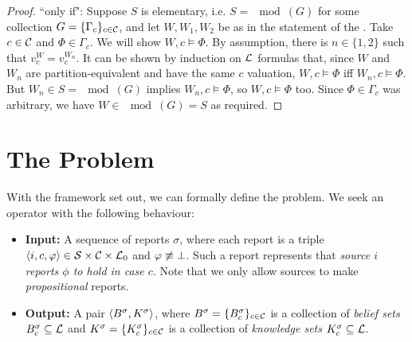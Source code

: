 \begin{proof}
    ``only if": Suppose $S$ is elementary, i.e. $S = \mod(G)$ for some
    collection $G = \{\Gamma_c\}_{c \in \mathcal{C}}$, and let $W, W_1, W_2$ be as in
    the statement of the . Take $c
    \in \mathcal{C}$ and $\Phi \in \Gamma_c$. We will show $W, c \models \Phi$. By assumption,
    there is $n \in \{1, 2\}$ such that $v^W_c = v^{W_n}_c$. It can be shown by
    induction on $\mathcal{L}{}$ formulas that, since $W$ and $W_n$ are
    partition-equivalent and have the same $c$ valuation, $W, c \models \Phi$ iff
    $W_n, c \models \Phi$. But $W_n \in S = \mod(G)$ implies $W_n, c \models
    \Phi$,
    so $W, c \models \Phi$ too.  Since $\Phi \in \Gamma_c$ was arbitrary, we have $W
    \in \mod(G) = S$ as required.

\end{proof}

\section{The Problem}
\label{kr_sec_the_problem}

With the framework set out, we can formally define the problem. We
seek an operator with the following behaviour:

\begin{itemize}

\item \textbf{Input:} A sequence of reports $\sigma$, where each report is a
      triple $\langle {i, c, \varphi} \rangle \in \mathcal{S} \times \mathcal{C} \times \mathcal{L}{}_0$ and $\varphi
      \not\equiv \bot$. Such a report represents that {\em source $i$
      reports $\phi$ to hold in case $c$}. Note that we only allow sources to
      make \emph{propositional} reports.

\item \textbf{Output:} A pair $\langle {B^\sigma, K^\sigma} \rangle$, where $B^\sigma =
      \{B^\sigma_c\}_{c \in \mathcal{C}}$ is a collection of \emph{belief sets}
      $B^\sigma_c \subseteq \mathcal{L}{}$ and $K^\sigma = \{K^\sigma_c\}_{c \in \mathcal{C}}$
      is a collection of \emph{knowledge sets} $K^\sigma_c \subseteq \mathcal{L}{}$.

\end{itemize}


